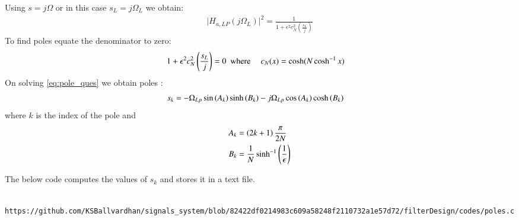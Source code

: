 \documentclass{article}
\begin{document}
\begin{enumerate}
		Using $s=j\Omega$ or in this case $s_{L}=j\Omega_{L}$ we obtain:
		\begin{align}
			\vert H_{a,LP}(j\Omega_L)\vert^2 = \frac{1}{1 + \epsilon^2c_N^2(\frac{s_L}{j})}
		\end{align}
		To find poles equate the denominator to zero:
		\begin{align}
			{1 + \epsilon^2c_N^2\ensuremath{\left(\frac{s_L}{j}\right)}} &=0\hspace{5pt }
			\text{where } \hspace{10pt}  c_N(x)= \cosh(N \cosh^{-1}x) \label{eq:pole_ques}
		\end{align}
		On solving \eqref{eq:pole_ques} we obtain poles :
		\begin{align}
			s_{k} &= -\Omega_{Lp} \sin\left(A_k\right)\sinh\left(B_k\right) - j\Omega_{Lp}\cos\left(A_k\right)\cosh\left(B_k\right)
		\end{align}
		where $k$ is the index of the pole and \\
		\begin{align}
			A_k &= \left(2k+1\right)\frac{\pi}{2N}\\
			B_k &= \frac{1}{N} \sinh^{-1}\left(\frac{1}{\epsilon}\right)
		\end{align}
		
		The below code computes the values of $s_k$ and stores it in a text file. 
		\begin{lstlisting}
			https://github.com/KSBallvardhan/signals_system/blob/82422df0214983c609a58248f2110732a1e57d72/filterDesign/codes/poles.c
		\end{lstlisting}
		

\end{enumerate}
\end{document}
